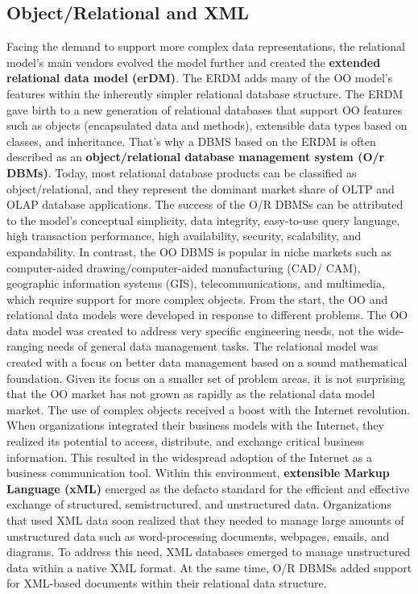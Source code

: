 \documentclass[a4paper, 12pt, titlepage]{report}
\begin{document}
\subsection{Object/Relational and XML}
Facing the demand to support more complex data representations, the relational model’s main vendors evolved the model further and created the \textbf{extended relational data model (erDM)}. The ERDM adds many of the OO model’s features within the inherently simpler relational database structure. The ERDM gave birth to a new generation of relational databases that support OO features such as objects (encapsulated data and methods), extensible data types based on classes, and inheritance. That’s why a DBMS based on the ERDM is often described as an \textbf{object/relational database management system (O/r DBMs)}. Today, most relational database products can be classified as object/relational, and
they represent the dominant market share of OLTP and OLAP database applications. The success of the O/R DBMSs can be attributed to the model’s conceptual simplicity, data integrity, easy-to-use query language, high transaction performance, high availability, security, scalability, and expandability. In contrast, the OO DBMS is popular in niche markets such as computer-aided drawing/computer-aided manufacturing (CAD/
CAM), geographic information systems (GIS), telecommunications, and multimedia, which require support for more complex objects.
From the start, the OO and relational data models were developed in response to different problems. The OO data model was created to address very specific engineering needs, not the wide-ranging needs of general data management tasks. The relational
model was created with a focus on better data management based on a sound mathematical foundation. Given its focus on a smaller set of problem areas, it is not surprising that the OO market has not grown as rapidly as the relational data model market. The use of complex objects received a boost with the Internet revolution. When organizations integrated their business models with the Internet, they realized its potential to access, distribute, and exchange critical business information. This resulted in the widespread adoption of the Internet as a business communication tool. Within this environment, \textbf{extensible Markup Language (xML)} emerged as the defacto standard for the efficient and effective exchange of structured, semistructured, and unstructured data. Organizations that used XML data soon realized that they needed to manage large amounts of unstructured data such as word-processing documents, webpages, emails, and diagrams. To address this need, XML databases emerged to manage unstructured data within a native XML format. At the same time, O/R DBMSs added support for XML-based documents within their relational data structure.
\end{document}
